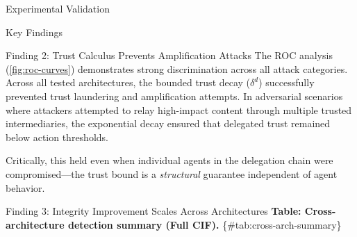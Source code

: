 \documentclass[
  ignorenonframetext,
]{beamer}
\begin{document}
\begin{frame}[fragile]{Experimental Validation}
\begin{block}{Key Findings}
\begin{block}{Finding 2: Trust Calculus Prevents Amplification Attacks}
The ROC analysis (\cref{fig:roc-curves}) demonstrates strong
discrimination across all attack categories. Across all tested
architectures, the bounded trust decay (\(\delta^d\)) successfully
prevented trust laundering and amplification attempts. In adversarial
scenarios where attackers attempted to relay high-impact content through
multiple trusted intermediaries, the exponential decay ensured that
delegated trust remained below action thresholds.

Critically, this held even when individual agents in the delegation
chain were compromised---the trust bound is a \textit{structural}
guarantee independent of agent behavior.
\end{block}

\begin{block}{Finding 3: Integrity Improvement Scales Across
Architectures}
\protect{}\label{finding-3-integrity-improvement-scales-across-architectures}
\textbf{Table: Cross-architecture detection summary (Full CIF).}
\{\#tab:cross-arch-summary\}


\end{block}
\end{block}
\end{frame}
\end{document}
